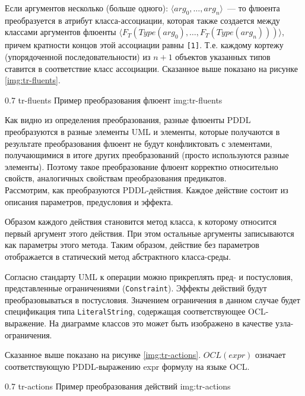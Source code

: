 Если аргументов несколько (больше одного): $\langle arg_0, \ldots, arg_n \rangle$~--- то флюента преобразуется в атрибут класса-ассоциации, которая также создается между классами аргументов флюенты $\langle F_T(Type(arg_0), \ldots, F_T(Type(arg_n))) \rangle$, причем кратности концов этой ассоциации равны \texttt{[1]}. Т.е. каждому кортежу (упорядоченной последовательности) из $n+1$ объектов указанных типов ставится в соответствие класс ассоциации.
Сказанное выше показано на рисунке \ref{img:tr-fluents}. 

{0.7}
{tr-fluents}
{Пример преобразования флюент}
{img:tr-fluents}

Как видно из определения преобразования, разные флюенты PDDL преобразуются в разные элементы UML и элементы, которые получаются в результате преобразования флюент не будут конфликтовать с элементами, получающимися в итоге других преобразований (просто используются разные элементы). Поэтому такое преобразование флюент корректно относительно свойств, аналогичных свойствам преобразования предикатов.
\\

Рассмотрим, как преобразуются PDDL-действия.
Каждое действие состоит из описания параметров, предусловия и эффекта.

Образом каждого действия становится метод класса, к которому относится первый аргумент этого действия. При этом остальные аргументы записываются как параметры этого метода. Таким образом, действие без параметров отображается в статический метод абстрактного класса-среды. 

Согласно стандарту UML к операции можно прикреплять пред- и постусловия, представленные ограничениями (\texttt{Constraint}). 
Эффекты действий будут преобразовываться в постусловия. Значением ограничения в данном случае будет спецификация типа \texttt{LiteralString}, содержащая соответствующее OCL-выражение. На диаграмме классов это может быть изображено в качестве узла-ограничения.

Сказанное выше показано на рисунке \ref{img:tr-actions}. $OCL(expr)$ означает соответствующую PDDL-выражению expr формулу на языке OCL.

{0.7}
{tr-actions}
{Пример преобразования действий}
{img:tr-actions}

